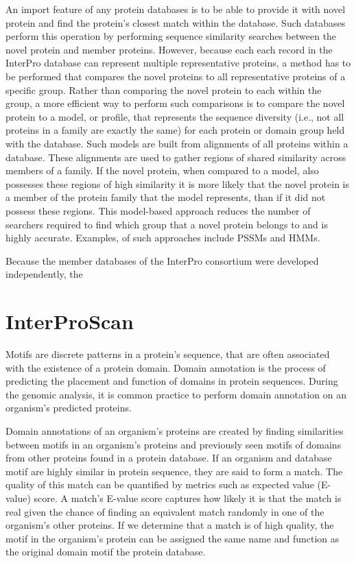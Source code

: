 An import feature of any protein databases is to be able to provide it with novel protein and find the protein's closest match within the database. Such databases perform this operation by performing sequence similarity searches between the novel protein and member proteins. However, because each each record in the InterPro database can represent multiple representative proteins, a method has to be performed that compares the novel proteins to all representative proteins of a specific group. Rather than comparing the novel protein to each within the group, a more efficient way to perform such comparisons is to compare the novel protein to a model, or profile, that represents the sequence diversity (i.e., not all proteins in a family are exactly the same) for each protein or domain group held with the database. Such models are built from alignments of all proteins within a database. These alignments are used to gather regions of shared similarity across members of a family. If the novel protein, when compared to a model, also possesses these regions of high similarity it is more likely that the novel protein is a member of the protein family that the model represents, than if it did not possess these regions. This model-based approach reduces the number of searchers required to find which group that a novel protein belongs to and is highly accurate. Examples, of such approaches include PSSMs and HMMs.


Because the member databases of the InterPro consortium were developed independently, the 

\section{InterProScan}

Motifs are discrete patterns in a protein's sequence, that are often associated with the existence of a protein domain. Domain annotation is the process of predicting the placement and function of domains in protein sequences. During the genomic analysis, it is common practice to perform domain annotation on an organism's predicted proteins.

Domain annotations of an organism's proteins are created by finding similarities between motifs in an organism's proteins and previously seen motifs of domains from other proteins found in a protein database. If an organism and database motif are highly similar in protein sequence, they are said to form a match. The quality of this match can be quantified by metrics such as expected value (E-value) score. A match's E-value score captures how likely it is that the match is real given the chance of finding an equivalent match randomly in one of the organism's other proteins. If we determine that a match is of high quality, the motif in the organism's protein can be assigned the same name and function as the original domain motif the protein database.


